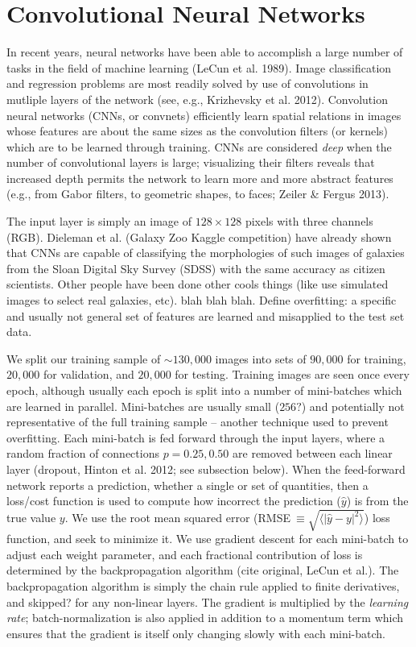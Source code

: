 \documentclass[fleqn,usenatbib]{mnras}
\begin{document}
\section{Convolutional Neural Networks}\label{sec:CNN}
In recent years, neural networks have been able to accomplish a large number of tasks in the field of machine learning (LeCun et al. 1989).
Image classification and regression problems are most readily solved by use of convolutions in mutliple layers of the network (see, e.g., Krizhevsky et al. 2012).
Convolution neural networks (CNNs, or convnets) efficiently learn spatial relations in images whose features are about the same sizes as the convolution filters (or kernels) which are to be learned through training.
CNNs are considered \textit{deep} when the number of convolutional layers is large; visualizing their filters reveals that increased depth permits the network to learn more and more abstract features (e.g., from Gabor filters, to geometric shapes, to faces; Zeiler \& Fergus 2013).

The input layer is simply an image of $128\times 128$ pixels with three channels (RGB).
Dieleman et al. (Galaxy Zoo Kaggle competition) have already shown that CNNs are capable of classifying the morphologies of such images of galaxies from the Sloan Digital Sky Survey (SDSS) with the same accuracy as citizen scientists.
Other people have been done other cools things (like use simulated images to select real galaxies, etc).
blah blah blah.
Define overfitting: a specific and usually not general set of features are learned and misapplied to the test set data.

We split our training sample of $\sim 130,000$ images into sets of $90,000$ for training, $20,000$ for validation, and $20,000$ for testing.
Training images are seen once every epoch, although usually each epoch is split into a number of mini-batches which are learned in parallel.
Mini-batches are usually small ($256?$) and potentially not representative of the full training sample -- another technique used to prevent overfitting.
Each mini-batch is fed forward through the input layers, where a random fraction of connections $p=0.25, 0.50$ are removed between each linear layer (dropout, Hinton et al. 2012; see subsection below).
When the feed-forward network reports a prediction, whether a single or set of quantities, then a loss/cost function is used to compute how incorrect the prediction ($\hat y$) is from the true value $y$.
We use the root mean squared error (RMSE$~\equiv \sqrt{\langle |\hat y - y|^2\rangle}$) loss function, and seek to minimize it.
We use gradient descent for each mini-batch to adjust each weight parameter, and each fractional contribution of loss is determined by the backpropagation algorithm (cite original, LeCun et al.).
The backpropagation algorithm is simply the chain rule applied to finite derivatives, and skipped? for any non-linear layers.
The gradient is multiplied by the \textit{learning rate}; batch-normalization is also applied in addition to a momentum term which ensures that the gradient is itself only changing slowly with each mini-batch.
\end{document}
